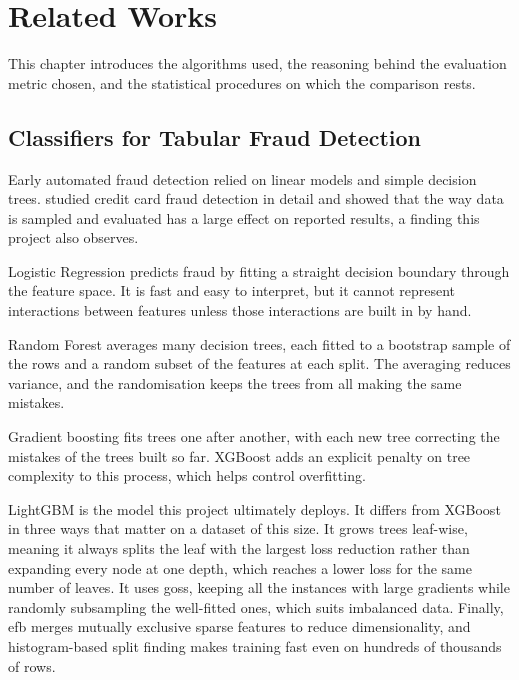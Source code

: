 \chapter{Related Works}
\label{ch:related}

This chapter introduces the algorithms used, the reasoning behind the evaluation metric
chosen, and the statistical procedures on which the comparison rests.

\section{Classifiers for Tabular Fraud Detection}

Early automated fraud detection relied on linear models and simple decision trees.
\citet{dalpozzolo2015calibrating} studied credit card fraud detection in detail and showed
that the way data is sampled and evaluated has a large effect on reported results, a
finding this project also observes.

Logistic Regression predicts fraud by fitting a straight decision boundary through
the feature space. It is fast and easy to interpret, but it cannot represent interactions
between features unless those interactions are built in by hand.

Random Forest \citep{breiman2001random} averages many decision trees, each fitted
to a bootstrap sample of the rows and a random subset of the features at each split. The
averaging reduces variance, and the randomisation keeps the trees from all making the same
mistakes.

Gradient boosting fits trees one after another, with each new tree correcting the
mistakes of the trees built so far. XGBoost \citep{chen2016xgboost} adds an explicit
penalty on tree complexity to this process, which helps control overfitting.

LightGBM \citep{ke2017lightgbm} is the model this project ultimately deploys. It
differs from XGBoost in three ways that matter on a dataset of this size. It grows trees
leaf-wise, meaning it always splits the leaf with the largest loss reduction rather than
expanding every node at one depth, which reaches a lower loss for the same number of
leaves. It uses \gls{goss}, keeping all the instances with large gradients while randomly
subsampling the well-fitted ones, which suits imbalanced data. Finally, \gls{efb} merges
mutually exclusive sparse features to reduce dimensionality, and histogram-based split
finding makes training fast even on hundreds of thousands of rows.

